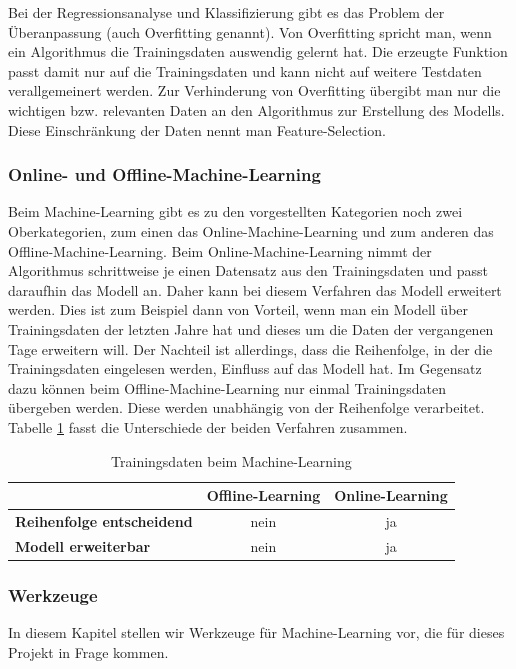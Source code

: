 {Bei der Regressionsanalyse und Klassifizierung gibt es das Problem der Überanpassung (auch Overfitting genannt). Von Overfitting spricht man, wenn ein Algorithmus die Trainingsdaten auswendig gelernt hat.
Die erzeugte Funktion passt damit nur auf die Trainingsdaten und kann nicht auf weitere
Testdaten verallgemeinert werden. Zur Verhinderung von Overfitting übergibt man nur die wichtigen bzw. relevanten Daten an den Algorithmus zur Erstellung des Modells. Diese Einschränkung der Daten nennt man Feature-Selection.

\subsubsection{Online- und Offline-Machine-Learning}

Beim Machine-Learning gibt es zu den vorgestellten Kategorien noch zwei Oberkategorien, zum einen das 
Online-Machine-Learning und zum anderen das Offline-Machine-Learning. 
Beim Online-Machine-Learning nimmt der Algorithmus schrittweise je einen Datensatz aus den Trainingsdaten
und passt daraufhin das Modell an.
Daher kann bei diesem Verfahren das Modell erweitert werden. 
Dies ist zum Beispiel dann von Vorteil, wenn man ein Modell über Trainingsdaten der letzten Jahre hat und dieses um die Daten der vergangenen Tage erweitern will. Der Nachteil ist allerdings, dass die Reihenfolge, in der die Trainingsdaten eingelesen werden, Einfluss auf das Modell hat.
Im Gegensatz dazu können beim Offline-Machine-Learning nur einmal Trainingsdaten übergeben werden. Diese werden unabhängig von der Reihenfolge verarbeitet. Tabelle \ref{tab:MachineLearningTrainingData}
fasst die Unterschiede der beiden Verfahren zusammen.

\begin{table}[H]
	\centering
\begin{tabular}{l|c|c} 
	\textbf{} & \textbf{Offline-Learning} & \textbf{Online-Learning}  \\  
	\hline \textbf{Reihenfolge entscheidend} & nein & ja \\
	\hline \textbf{Modell erweiterbar} & nein & ja 
	\vspace{0.3cm} 
\end{tabular} 
\caption{Trainingsdaten beim Machine-Learning}
\label{tab:MachineLearningTrainingData}
\end{table}
 
\subsubsection{Werkzeuge}
In diesem Kapitel stellen wir Werkzeuge für Machine-Learning vor, die für dieses Projekt in Frage kommen.

}

